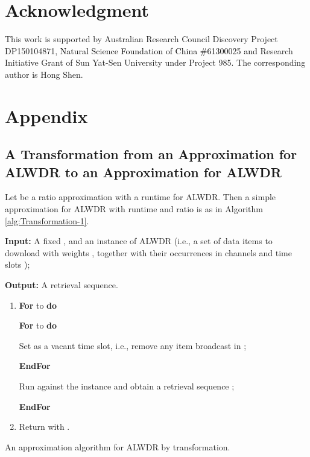 \documentclass[11pt,english,onecolumn,draftcls]{IEEEtran}
\theoremstyle{plain}
\theoremstyle{plain}
\theoremstyle{plain}
\theoremstyle{plain}
\begin{document}
\section*{Acknowledgment}

This work is supported by Australian Research Council Discovery Project
DP150104871, \textcolor{black}{Natural Science Foundation of China
\#61300025 and} Research Initiative Grant of Sun Yat-Sen University
under Project 985. The corresponding author is Hong Shen.






\section*{Appendix}


\subsection*{A Transformation from an Approximation for ALWDR
to an Approximation for ALWDR }

Let  be a ratio  approximation with a runtime
 for ALWDR. Then a simple
approximation for ALWDR with runtime 
and ratio  is as in Algorithm \ref{alg:Transformation-1}.

\begin{algorithm}
\textbf{Input: }A fixed , and an instance of ALWDR
(i.e., a set of data items to download 
with weights , together with their occurrences
in channels and time slots );

\textbf{Output:} A retrieval sequence.
\begin{enumerate}
\item \textbf{For}  to 
\textbf{do}


\textbf{For}  to 
\textbf{do}


\textbf{}Set 
as a vacant time slot, i.e., remove any item broadcast in 
;


\textbf{EndFor}


\textbf{}Run  against the instance and obtain a
retrieval sequence ;


\textbf{EndFor}

\item Return  with  .
\end{enumerate}
\protect\caption{\label{alg:Transformation-1}An approximation algorithm for ALWDR
by transformation.}
\end{algorithm}
\end{document}
